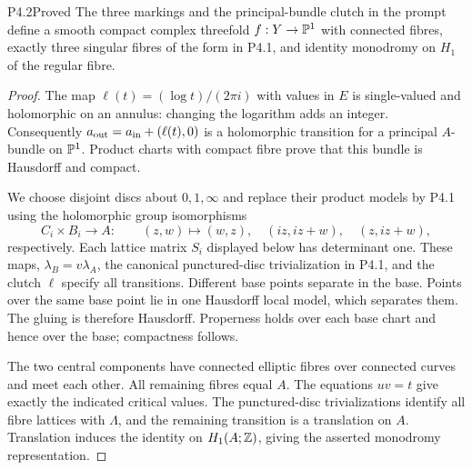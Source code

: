\begin{statement}{P4.2}{Proved}
The three markings and the principal-bundle clutch in the prompt define a
smooth compact complex threefold $f:Y\to\mathbb P^1$ with connected fibres,
exactly three singular fibres of the form in P4.1, and identity monodromy
on $H_1$ of the regular fibre.
\end{statement}
\begin{proof}
The map $\ell(t)=(\log t)/(2\pi i)$ with values in $E$ is single-valued and
holomorphic on an annulus: changing the logarithm adds an integer.
Consequently $a_{\rm out}=a_{\rm in}+(\ell(t),0)$ is a holomorphic transition
for a principal $A$-bundle on $\mathbb P^1$. Product charts with compact fibre
prove that this bundle is Hausdorff and compact.

We choose disjoint discs about $0,1,\infty$ and replace their product models
by P4.1 using the holomorphic group isomorphisms
\[
 C_i\times B_i\longrightarrow A:\qquad
 (z,w)\mapsto(w,z),\quad(iz,iz+w),\quad(z,iz+w),
\]
respectively. Each lattice matrix $S_i$ displayed below has determinant
one. These maps, $\lambda_B=v\lambda_A$, the canonical punctured-disc
trivialization in P4.1, and the clutch $\ell$ specify all transitions.
Different base points separate in the base. Points over the same base
point lie in one Hausdorff local model, which separates them. The gluing is
therefore Hausdorff. Properness holds over each base chart and hence over
the base; compactness follows.

The two central components have connected elliptic fibres over connected
curves and meet each other. All remaining fibres equal $A$. The equations
$uv=t$ give exactly the indicated critical values. The punctured-disc
trivializations identify all fibre lattices with $\Lambda$, and the remaining
transition is a translation on $A$. Translation induces the identity on
$H_1(A;\mathbb Z)$, giving the asserted monodromy representation.
\end{proof}

